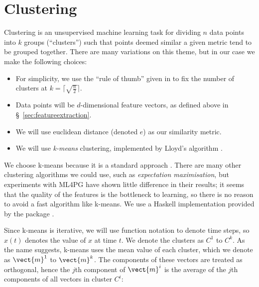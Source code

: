 \section{Clustering}
\label{sec:clustering}

Clustering is an unsupervised machine learning task for dividing $n$ data points
into $k$ groups (``clusters'') such that points deemed similar a given metric
tend to be grouped together. There are many variations on this theme, but in our
case we make the following choices:

\begin{itemize}
\item For simplicity, we use the ``rule of thumb'' given in
  \cite[pp. 365]{mardia1979multivariate} to fix the number of clusters at
  $k = \lceil \sqrt{\frac{n}{2}} \rceil$.
\item Data points will be $d$-dimensional feature vectors, as defined above in
  \S~\ref{sec:featureextraction}.
\item We will use euclidean distance (denoted $e$) as our similarity metric.
\item We will use \emph{k-means} clustering, implemented by Lloyd's algorithm
  \cite{lloyd1982least}.
\end{itemize}

\iffalse
TODO: Alison: It would be good to have justification of the previous
items as well.
\fi

We choose k-means because it is a standard approach \iffalse TODO: Alison: Is
there a reference for this? \fi. There are many other clustering algorithms we
could use, such as \emph{expectation maximisation}, but experiments with
\textsc{ML4PG} have shown little difference in their results; \iffalse TODO:
Alison: Whose experiments? Yours (include something in appendix?) Someone else's
(reference)? MY THOUGHTS: Conversation with Katya; maybe check ML4PG papers, or
omit \fi it seems that \iffalse TODO: Alison: a bit informal and vague \fi the
quality of the features is the bottleneck to learning, so there is no reason to
avoid a fast algorithm like k-means. We use a Haskell implementation provided by
the package .

Since k-means is iterative, we will use function notation to denote time steps,
so $x(t)$ denotes the value of $x$ at time $t$. \iffalse TODO: Alison: Pick a
tense and stick to it. I'd suggest the present tense throughout \fi We denote
the clusters as $C^1$
to $C^k$. As the name suggests, k-means uses the mean value of each cluster,
which we denote as $\vect{m}^1$ to $\vect{m}^k$. The components of these vectors
are treated as orthogonal, hence the $j$th component of $\vect{m}^i$ is the
average of the $j$th components of all vectors in cluster $C^i$:

